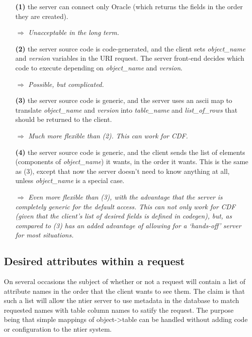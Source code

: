 \begin{itemize}

\item[\textbf{ (1)}] the server can connect only Oracle
	(which returns the fields in the order they are created).  

	{$\Rightarrow$} \textsl{ Unacceptable in the long term.}

\item[\textbf{ (2)}] the server source code is code-generated, and the client
	sets \textit{object\_name} and \textit{ version} variables in the URI
	request.  The server front-end decides which code to execute
	depending on \textit{ object\_name} and \textit{ version}.

	{$\Rightarrow$} \textsl{ Possible, but complicated.}


\item[\textbf{ (3)}] the server source code is generic, and the server uses an ascii
	map to translate \textit{ object\_name} and \textit{ version} into 
	\textit{ table\_name} and \textit{ list\_of\_rows} that should be
	returned to the client.

	{$\Rightarrow$} \textsl{ Much more flexible than (2).  This can 
	work for CDF.}


\item[\textbf{ (4)}] the server source code is generic, and the client sends
	the list of elements (components of \textit{ object\_name}) it wants,
        in the order it wants.  This is the same as (3), except that
        now the server doesn't need to know anything at all, unless
        \textit{ object\_name} is a special case.


	{$\Rightarrow$} \textsl{ Even more flexible than (3), with the
	advantage that the server is completely generic for the default
	access.  This can not only work for CDF (given that the client's
        list of desired fields is defined in codegen), but, as compared
	to (3) has an added advantage of allowing for a `hands-off' 
	server for most situations.}

\end{itemize}

\subsection{Desired attributes within a request}

On several occasions the subject of whether or not a request will
contain a list of attribute names in the order that the client wants
to see them.  The claim is that such a list will allow the ntier
server to use metadata in the database to match requested names with
table column names to satify the request.  The purpose being that
simple mappings of object->table can be handled without adding code
or configuration to the ntier system.

